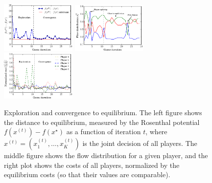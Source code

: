 \documentclass{sig-alternate-ipsn13}
\begin{document}



\begin{figure}
  \centering
  \includegraphics[width=0.33\textwidth]{images/global_potential_function.eps}%
  \includegraphics[width=0.33\textwidth]{images/player_behavior.eps}%
  \includegraphics[width=0.33\textwidth]{images/players_costs.eps}%
  \caption{\footnotesize Exploration and convergence to equilibrium. The left figure shows the distance to equilibrium, measured by the Rosenthal potential $f(x^{(t)}) - f(x^\star)$ as a function of iteration $t$, where $x^{(t)} = (x_1^{(t)}, \dots, x_K^{(t)})$ is the joint decision of all players. The middle figure shows the flow distribution for a given player, and the right plot shows the costs of all players, normalized by the equilibrium costs (so that their values are comparable).}
  \label{fig:global_potential}
\end{figure}
\end{document}
